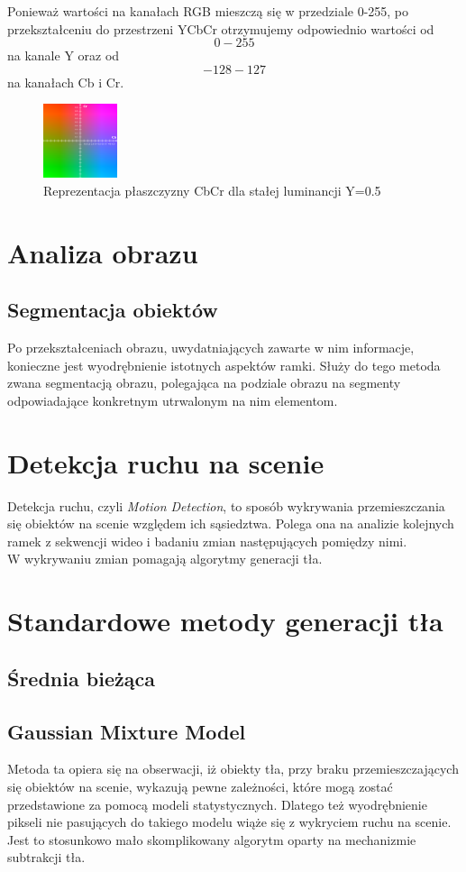 Ponieważ wartości na kanałach RGB mieszczą się w przedziale 0-255, po przekształceniu do przestrzeni YCbCr otrzymujemy odpowiednio wartości od \[ 0-255\] na kanale Y oraz od \[-128-127 \] na kanałach Cb i Cr.
\begin{figure}[!htb]
\centering
\includegraphics[width=82px]{img/YCbCr}
\caption{Reprezentacja płaszczyzny 
CbCr dla stałej luminancji Y=0.5}
\end{figure}
\section{Analiza obrazu} 
\subsection{Segmentacja obiektów}
Po przekształceniach obrazu, uwydatniających zawarte w nim informacje, konieczne jest wyodrębnienie istotnych aspektów ramki. Służy do tego metoda zwana segmentacją obrazu, polegająca na podziale obrazu na segmenty odpowiadające konkretnym utrwalonym na nim elementom.
\section{Detekcja ruchu na scenie}
Detekcja ruchu, czyli \textit{Motion Detection}, to sposób wykrywania przemieszczania się obiektów na scenie względem ich sąsiedztwa. Polega ona na analizie kolejnych ramek z sekwencji wideo i badaniu zmian następujących pomiędzy nimi.\\
W wykrywaniu zmian pomagają algorytmy generacji tła.
\section{Standardowe metody generacji tła}
\subsection{Średnia bieżąca}
\cite{collins2003mean}
\subsection{Gaussian Mixture Model}
\label{sec:GMM}
Metoda ta \cite{zivkovic2004improved} opiera się na obserwacji, iż obiekty tła, przy braku przemieszczających się obiektów na scenie, wykazują pewne zależności, które mogą zostać przedstawione za pomocą modeli statystycznych. Dlatego też wyodrębnienie pikseli nie pasujących do takiego modelu wiąże się z wykryciem ruchu na scenie. Jest to stosunkowo mało skomplikowany algorytm oparty na mechanizmie subtrakcji tła.
